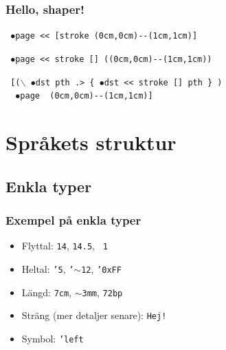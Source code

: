 \documentclass[noamsthm,handout]{beamer}
\begin{document}
\begin{frame}[fragile]
  \frametitle{Hello, shaper!}

\texttt{%
$\bullet$page <{}< [stroke (0cm,0cm)-{}-(1cm,1cm)]
}

\pause

\texttt{%
$\bullet$page <{}< stroke [] ((0cm,0cm)-{}-(1cm,1cm))
}

\pause

\texttt{%
[($\backslash$ $\bullet$dst pth .> \{ $\bullet$dst <{}< stroke [] pth \} )\\
\ \ $\bullet$page \ (0cm,0cm)-{}-(1cm,1cm)]
}

\end{frame}

\section{Språkets struktur}

\subsection{Enkla typer}
\begin{frame}[fragile]\frametitle{Exempel på enkla typer}
  \begin{itemize}
  \item Flyttal: \texttt{14}, \texttt{14.5}, \texttt{~1}
  \item Heltal: \texttt{'5}, \texttt{'$\sim$12}, \texttt{'0xFF}
  \item Längd: \texttt{7cm}, \texttt{$\sim$3mm}, \texttt{72bp}
  \item Sträng (mer detaljer senare): \texttt{\textasciigrave{}Hej!\textasciiacute{}}
  \item Symbol: \texttt{'left}
  \end{itemize}
\end{frame}
\end{document}
